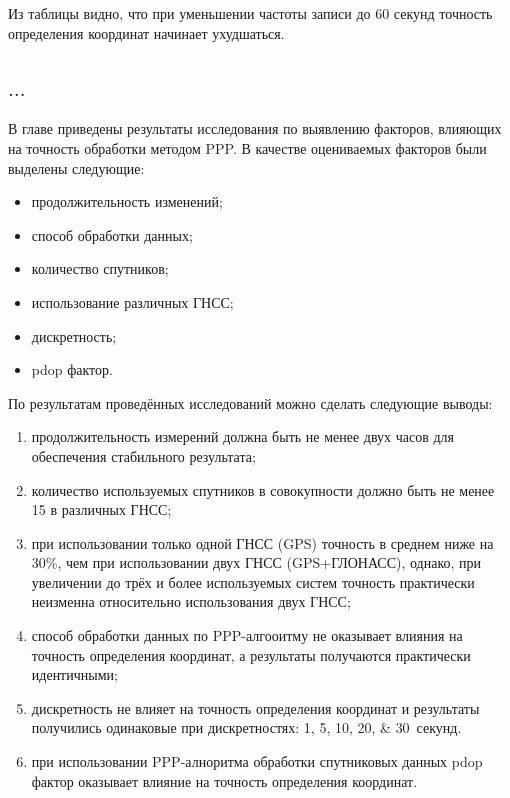 Из таблицы видно, что при уменьшении частоты записи до 60 секунд точность определения координат начинает ухудшаться.



\subsection{$\ldots$}\label{subsec:ch2/sec3/sub5}

В главе приведены результаты исследования по выявлению факторов, влияющих на точность обработки методом PPP. В качестве оцениваемых факторов были выделены следующие: 
\begin{itemize}
	\item продолжительность изменений; 
	\item способ обработки данных; 
	\item количество спутников; 
	\item использование различных ГНСС; 
	\item дискретность; 
	\item pdop  фактор.
\end{itemize} 

По результатам проведённых исследований можно сделать следующие выводы: 
\begin{enumerate}
	\item	продолжительность измерений должна быть не менее двух часов для обеспечения стабильного результата;
	\item	количество используемых  спутников в совокупности должно быть не менее 15 в различных ГНСС;
	\item	при использовании только одной ГНСС (GPS) точность в среднем ниже на 30\%, чем при использовании двух ГНСС (GPS+ГЛОНАСС), однако, при увеличении до трёх и более используемых систем точность практически неизменна относительно использования двух ГНСС;
	\item	способ обработки данных по PPP-алгооитму не оказывает влияния на точность определения координат, а результаты получаются практически идентичными;
	\item	дискретность не влияет на точность определения координат и результаты получились одинаковые при дискретностях: \numlist{1;5;10;20;30}~секунд. 
	\item	при использовании PPP-алноритма обработки спутниковых данных pdop фактор оказывает влияние на точность определения координат.
\end{enumerate}
